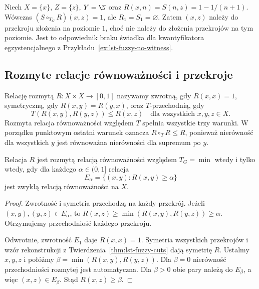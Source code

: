 \begin{przyklad}
\label{ex:ncl-relation-cut-no-witness}
Niech $X=\{x\}$, $Z=\{z\}$, $Y=\N$ oraz
$R(x,n)=S(n,z)=1-1/(n+1)$.
Wówczas $(S\circ_{T_G}R)(x,z)=1$, ale $R_1=S_1=\varnothing$.
Zatem $(x,z)$ należy do przekroju złożenia na poziomie $1$,
choć nie należy do złożenia przekrojów na tym poziomie.
Jest to odpowiednik braku świadka dla kwantyfikatora
egzystencjalnego z Przykładu~\ref{ex:lst-fuzzy-no-witness}.
\end{przyklad}

\subsection{Rozmyte relacje równoważności i przekroje}

\begin{definicja}\label{def:lst-fuzzy-equivalence}
Relację rozmytą $R:X\times X\to[0,1]$ nazywamy zwrotną,
gdy $R(x,x)=1$, symetryczną, gdy $R(x,y)=R(y,x)$,
oraz $T$-przechodnią, gdy
\[
 T(R(x,y),R(y,z))\leq R(x,z)
 \quad\text{dla wszystkich }x,y,z\in X.
\]
Rozmyta relacja równoważności względem $T$ spełnia wszystkie
trzy warunki. W porządku punktowym ostatni warunek oznacza
$R\circ_T R\leq R$, ponieważ nierówność dla wszystkich
$y$ jest równoważna nierówności dla supremum po $y$.
\end{definicja}

\begin{twierdzenie}
\label{thm:lst-fuzzy-equivalence-cuts}
Relacja $R$ jest rozmytą relacją równoważności względem
$T_G=\min$ wtedy i tylko wtedy, gdy dla każdego
$\alpha\in(0,1]$ relacja
\[
 E_\alpha=\{(x,y):R(x,y)\geq\alpha\}
\]
jest zwykłą relacją równoważności na $X$.
\end{twierdzenie}
\begin{proof}
Zwrotność i symetria przechodzą na każdy przekrój.
Jeżeli $(x,y),(y,z)\in E_\alpha$, to
$R(x,z)\geq\min(R(x,y),R(y,z))\geq\alpha$.
Otrzymujemy przechodniość każdego przekroju.

Odwrotnie, zwrotność $E_1$ daje $R(x,x)=1$.
Symetria wszystkich przekrojów i wzór rekonstrukcji
z Twierdzenia~\ref{thm:lst-fuzzy-cuts} dają symetrię $R$.
Ustalmy $x,y,z$ i połóżmy
$\beta=\min(R(x,y),R(y,z))$. Dla $\beta=0$ nierówność
przechodniości rozmytej jest automatyczna. Dla $\beta>0$
obie pary należą do $E_\beta$, a więc $(x,z)\in E_\beta$.
Stąd $R(x,z)\geq\beta$.
\end{proof}

